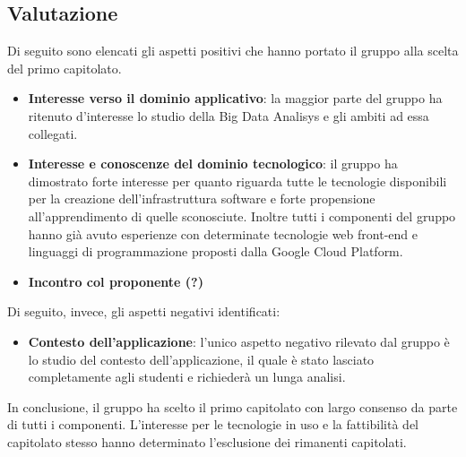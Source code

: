 \subsection{Valutazione}
Di seguito sono elencati gli aspetti positivi che hanno portato il gruppo alla scelta del primo capitolato.
\begin{itemize}
\item \textbf{Interesse verso il dominio applicativo}: la maggior parte del gruppo ha ritenuto d'interesse lo studio della Big Data Analisys e gli ambiti ad essa collegati.
\item \textbf{Interesse e conoscenze del dominio tecnologico}: il gruppo ha dimostrato forte interesse per quanto riguarda tutte le tecnologie disponibili per la creazione dell'infrastruttura software e forte propensione all'apprendimento di quelle sconosciute. Inoltre tutti i componenti del gruppo hanno già avuto esperienze con determinate tecnologie web front-end e linguaggi di programmazione proposti dalla Google Cloud Platform.
\item \textbf{Incontro col proponente (?)}
\end{itemize}
Di seguito, invece, gli aspetti negativi identificati:
\begin{itemize}
\item \textbf{Contesto dell'applicazione}: l'unico aspetto negativo rilevato dal gruppo è lo studio del contesto dell'applicazione, il quale è stato lasciato completamente agli studenti e richiederà un lunga analisi.
\end{itemize}
In conclusione, il gruppo ha scelto il primo capitolato con largo consenso da parte di tutti i componenti. L'interesse per le tecnologie in uso e la fattibilità del capitolato stesso hanno determinato l'esclusione dei rimanenti capitolati.





